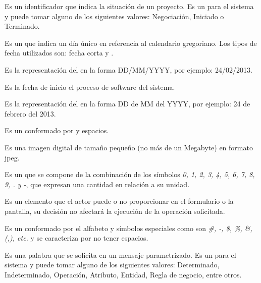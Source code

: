 \begin{description}
	 Es un identificador que indica la situación de un proyecto. Es un  para el sistema y puede tomar alguno de los siguientes valores:
	Negociación, Iniciado o Terminado.

	 Es un  que indica un día único en referencia al calendario gregoriano. Los tipos de fecha utilizados son: 
	{fecha corta} y . %

	 Es la representación del   en la forma DD/MM/YYYY, por ejemplo: 24/02/2013.
	
	 Es la fecha de inicio el proceso de software del sistema.

	 Es la representación del   en la forma DD de MM del YYYY, por ejemplo: 24 de febrero del 2013.

	 Es un  conformado por  y espacios.
	
	 Es una imagen digital de tamaño pequeño (no más de un Megabyte) en formato jpeg.
	
	 Es un  que se compone de la combinación de los símbolos \textit{0, 1, 2, 3, 4, 5, 6, 7, 8, 9, . y -},  que expresan una cantidad 
	en relación a su unidad.
	
	 Es un elemento que el actor puede o no proporcionar en el formulario o la pantalla, su decisión no afectará la ejecución de la operación solicitada.

	 Es un   conformado por el alfabeto y símbolos especiales como son 
	\textit{\#, -, \$, \%, \&, (,), etc.} y se caracteriza por no tener espacios.
	
	 Es una palabra que se solicita en un mensaje parametrizado. Es un  para el sistema y puede tomar alguno de los siguientes valores:
	Determinado, Indeterminado, Operación, Atributo, Entidad, Regla de negocio, entre otros.
	

\end{description}

